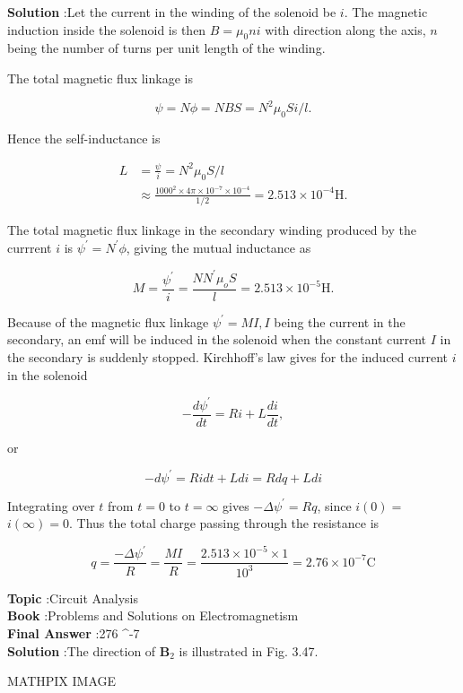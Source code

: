 \documentclass[10pt]{article}
\begin{document}
\textbf{Solution} :Let the current in the winding of the solenoid be $i$. The magnetic induction inside the solenoid is then $B=\mu_{0} n i$ with direction along the axis, $n$ being the number of turns per unit length of the winding.

The total magnetic flux linkage is

$$
\psi=N \phi=N B S=N^{2} \mu_{0} S i / l .
$$

Hence the self-inductance is

$$
\begin{aligned}
L &=\frac{\psi}{i}=N^{2} \mu_{0} S / l \\
& \approx \frac{1000^{2} \times 4 \pi \times 10^{-7} \times 10^{-4}}{1 / 2}=2.513 \times 10^{-4} \mathrm{H} .
\end{aligned}
$$

The total magnetic flux linkage in the secondary winding produced by the currrent $i$ is $\psi^{\prime}=N^{\prime} \phi$, giving the mutual inductance as

$$
M=\frac{\psi^{\prime}}{i}=\frac{N N^{\prime} \mu_{o} S}{l}=2.513 \times 10^{-5} \mathrm{H} .
$$

Because of the magnetic flux linkage $\psi^{\prime}=M I, I$ being the current in the secondary, an emf will be induced in the solenoid when the constant current $I$ in the secondary is suddenly stopped. Kirchhoff's law gives for the induced current $i$ in the solenoid

$$
-\frac{d \psi^{\prime}}{d t}=R i+L \frac{d i}{d t},
$$

or

$$
-d \psi^{\prime}=R i d t+L d i=R d q+L d i
$$

Integrating over $t$ from $t=0$ to $t=\infty$ gives $-\Delta \psi^{\prime}=R q$, since $i(0)=$ $i(\infty)=0$. Thus the total charge passing through the resistance is

$$
q=\frac{-\Delta \psi^{\prime}}{R}=\frac{M I}{R}=\frac{2.513 \times 10^{-5} \times 1}{10^{3}}=2.76 \times 10^{-7} \mathrm{C}
$$

\textbf{Topic} :Circuit Analysis\\
\textbf{Book} :Problems and Solutions on Electromagnetism\\
\textbf{Final Answer} :276 ^{-7} \\


\textbf{Solution} :The direction of $\mathbf{B}_{2}$ is illustrated in Fig. 3.47. 

MATHPIX IMAGE
\end{document}
